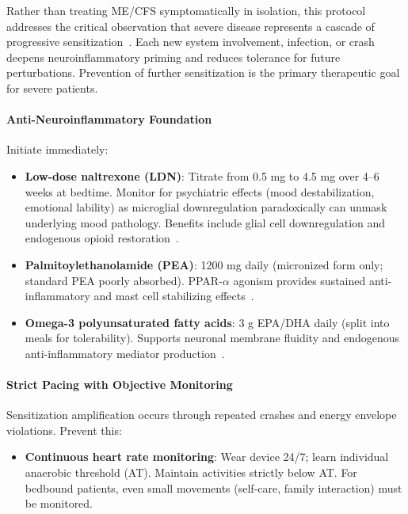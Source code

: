\begin{protocol}
\label{prot:sensitization-prevention}

Rather than treating ME/CFS symptomatically in isolation, this protocol addresses the critical observation that severe disease represents a cascade of progressive sensitization~\cite{MCMC2024Neurometabolic}. Each new system involvement, infection, or crash deepens neuroinflammatory priming and reduces tolerance for future perturbations. Prevention of further sensitization is the primary therapeutic goal for severe patients.

\paragraph{Anti-Neuroinflammatory Foundation}

Initiate immediately:
\begin{itemize}
    \item \textbf{Low-dose naltrexone (LDN)}: Titrate from 0.5 mg to 4.5 mg over 4--6 weeks at bedtime. Monitor for psychiatric effects (mood destabilization, emotional lability) as microglial downregulation paradoxically can unmask underlying mood pathology. Benefits include glial cell downregulation and endogenous opioid restoration~\cite{NIH2024MECFSRoadmap}.

    \item \textbf{Palmitoylethanolamide (PEA)}: 1200 mg daily (micronized form only; standard PEA poorly absorbed). PPAR-$\alpha$ agonism provides sustained anti-inflammatory and mast cell stabilizing effects~\cite{Vina2025pea}.

    \item \textbf{Omega-3 polyunsaturated fatty acids}: 3 g EPA/DHA daily (split into meals for tolerability). Supports neuronal membrane fluidity and endogenous anti-inflammatory mediator production~\cite{MCMC2024Neurometabolic}.
\end{itemize}

\paragraph{Strict Pacing with Objective Monitoring}

Sensitization amplification occurs through repeated crashes and energy envelope violations. Prevent this:
\begin{itemize}
    \item \textbf{Continuous heart rate monitoring}: Wear device 24/7; learn individual anaerobic threshold (AT). Maintain activities strictly below AT. For bedbound patients, even small movements (self-care, family interaction) must be monitored.


\end{itemize}
\end{protocol}
